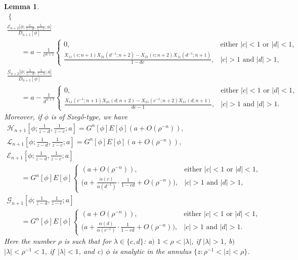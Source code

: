 \documentclass[pdftex]{sigma}
\numberwithin{equation}{section}
\newtheorem{Lemma}[Theorem]{Lemma}
 { \theoremstyle{definition}
\newtheorem{Definition}[Theorem]{Definition}
\newtheorem{Example}[Theorem]{Example}
\newtheorem{Remark}[Theorem]{Remark}
\newtheorem{Question}[Theorem]{Question}
}
\newcommand{\al}{\alpha}
\newcommand{\la}{\lambda}
\begin{document}
\begin{Lemma}
\begin{gather}
\begin{cases}
					\end{cases}
\\
					\frac{\mathscr{E}_{n+2}\big[\phi; \tfrac{1}{z-d},\tfrac{1}{z-c};a\big]}{D_{n+1}[\phi]}\nonumber\\
 \qquad= a - \frac{1}{c^{n+1}} \begin{cases}
						0, & \text{either $|c|<1$ or $|d|<1$,} \\
						 \tfrac{ X_{11}(c;n+1)X_{21}(d^{-1};n+2) - X_{21}(c;n+2)X_{11}(d^{-1};n+1) }{1-dc}, & \text{$|c|>1$ and $|d|>1$,}
					\end{cases}\nonumber
\\
					 	\frac{\mathscr{G}_{n+2}\big[\phi; \tfrac{1}{z-d},\tfrac{1}{z-c};a\big]}{D_{n+1}[\phi]}\nonumber \\
\qquad= a - \frac{1}{d^{n+1}} \begin{cases}
						0, & \text{either $|c|<1$ or $|d|<1$}, \\
						 \tfrac{ X_{11}(c^{-1};n+1)X_{21}(d;n+2) - X_{21}(c^{-1};n+2)X_{11}(d;n+1) }{dc-1}, & \text{$|c|>1$ and $|d|>1$}.
					\end{cases}\nonumber
			\end{gather}
	Moreover, if $\phi$ is of Szeg\H{o}-type, we have
			\begin{gather}
				\mathscr{H}_{n+1}\left[\phi; \frac{1}{z-d},\frac{1}{z-c};a\right] = G^n[\phi] E[\phi] (a + O(\rho^{-n})),\label{asymp H rationals}\\
				\mathscr{L}_{n+1}\left[\phi; \frac{1}{z-d},\frac{1}{z-c};a\right] = G^n[\phi] E[\phi] (a + O(\rho^{-n})),\nonumber\\
				\mathscr{E}_{n+1}\left[\phi; \frac{1}{z-d},\frac{1}{z-c};a\right]\nonumber\\
\qquad = G^n[\phi] E[\phi] \begin{cases}
					(a + O(\rho^{-n})), & \text{either $|c|<1$ or $|d|<1$}, \\
				 	\big( a + \tfrac{\al(c)}{\al(d^{-1})}\cdot \tfrac{1}{1-cd} + O(\rho^{-n}) \big), & \text{$|c|>1$ and $|d|>1$},
				\end{cases}	\nonumber
\\
				\mathscr{G}_{n+1}\left[\phi; \frac{1}{z-d},\frac{1}{z-c};a\right]\nonumber\\
\qquad = G^n[\phi] E[\phi] \begin{cases}
					(a + O(\rho^{-n})), & \text{either $|c|<1$ or $|d|<1$}, \\
					\big( a + \tfrac{\al(d)}{\al(c^{-1})}\cdot \tfrac{1}{1-cd} + O(\rho^{-n}) \big), & \text{$|c|>1$ and $|d|>1$}.
				\end{cases} 		\nonumber			
			\end{gather}
			Here the number $\rho$ is such that for $\la \in \{c,d\}$: a$)$ $1<\rho < |\la|$, if $|\la|>1$, b$)$ $|\la|<\rho^{-1}<1$, if~${|\la|<1}$, and c$)$ $\phi$ is analytic in the annulus $\big\{z\colon \rho^{-1}<|z|<\rho\big\}$.
		\end{Lemma}
\end{document}
